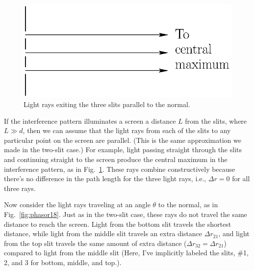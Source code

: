 \begin{figure}\begin{center}
 \includegraphics[width=2.0truein]{phasors/phasor17} 
\caption{\label{fig:phasor17}Light rays exiting the three slits
parallel to the normal.}
\end{center}
\end{figure}


If the interference pattern illuminates a screen a distance $L$ from
the slits, where $L\gg d$, then we can assume that the light rays from
each of the slits to any particular point on the screen are parallel.
(This is the same approximation we made in the two-slit case.) For
example, light passing straight through the slits and continuing
straight to the screen produce the central maximum in the interference
pattern, as in Fig.~\ref{fig:phasor17}.
 These rays combine constructively because there's no
difference in the path length for the three light rays, i.e., $\Delta
r = 0$ for all three rays.

Now consider the light rays traveling at an angle $\theta$ to the normal,
as in Fig.~\ref{fig:phasor18}.
 Just as in the two-slit case, these rays do not travel the
same distance to reach the screen. Light from the bottom slit travels
the shortest distance, while light from the middle slit travels an
extra distance $\Delta r_{21}$, and light from the top slit travels
the same amount of extra distance ($\Delta r_{32} = \Delta r_{21}$)
compared to light from the middle slit (Here, I've implicitly labeled
the slits, \#1, 2, and 3 for bottom, middle, and top.).


